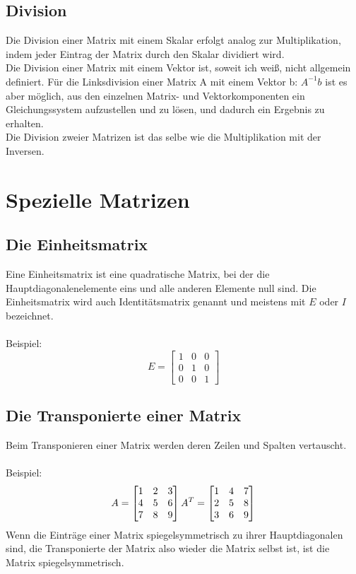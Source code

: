 \documentclass[11pt]{scrreprt}
\begin{document}
\subsection{Division}
Die Division einer Matrix mit einem Skalar erfolgt analog zur Multiplikation, indem jeder Eintrag der Matrix durch den Skalar dividiert wird.\\
Die Division einer Matrix mit einem Vektor ist, soweit ich weiß, nicht allgemein definiert. Für die Linksdivision einer Matrix A mit einem Vektor b: $A^{-1}b$ ist es aber möglich, aus den einzelnen Matrix- und Vektorkomponenten ein Gleichungssystem aufzustellen und zu lösen, und dadurch ein Ergebnis zu erhalten.\\
Die Division zweier Matrizen ist das selbe wie die Multiplikation mit der Inversen.

\section{Spezielle Matrizen}
\subsection{Die Einheitsmatrix}
Eine Einheitsmatrix ist eine quadratische Matrix, bei der die Hauptdiagonalenelemente eins und alle anderen Elemente null sind.
Die Einheitsmatrix wird auch Identitätsmatrix genannt und meistens mit $E$ oder $I$ bezeichnet.\\
\\
Beispiel:
\begin{equation}
E =
\begin{bmatrix}
1 & 0 & 0 \\
0 & 1 & 0 \\
0 & 0 & 1 
\end {bmatrix}
\end{equation}
\subsection{Die Transponierte einer Matrix}
Beim Transponieren einer Matrix werden deren Zeilen und Spalten vertauscht.\\
\\
Beispiel:
\begin{equation}
A =
\begin{bmatrix}
1 & 2 & 3 \\
4 & 5 & 6 \\
7 & 8 & 9 
\end {bmatrix}\\
\\
\\
\\
A^T = 
\begin{bmatrix}
1 & 4 & 7 \\
2 & 5 & 8 \\
3 & 6 & 9 
\end {bmatrix}
\end{equation}
Wenn die Einträge einer Matrix spiegelsymmetrisch zu ihrer Hauptdiagonalen sind, die Transponierte der Matrix also wieder die Matrix selbst ist, ist die Matrix spiegelsymmetrisch.
\end{document}
